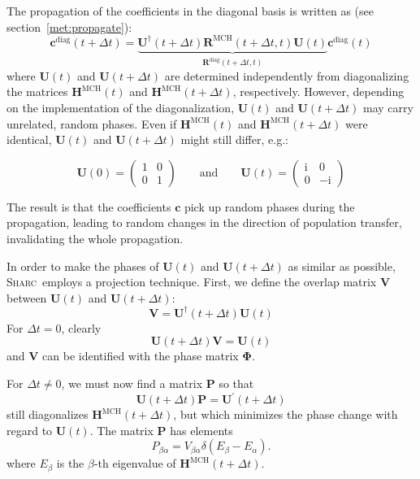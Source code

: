 \documentclass[a4paper,11pt,DIV=15,openany,twoside=false]{scrbook}
\newcommand{\tthdump}[1]{#1}
\newcommand{\sharc}{\textsc{Sharc}}
\newcommand{\I}{\ensuremath{\mathrm{i}}}
\renewcommand{\vec}[1]{\ensuremath{\mathbf{#1}}}
\begin{document}
The propagation of the coefficients in the diagonal basis is written as (see section~\ref{met:propagate}):
\begin{equation}
  \vec{c}^{\text{diag}}(t+\Delta t)=\underbrace{\vec{U}^\dagger(t+\Delta t)\vec{R}^{\text{MCH}}(t+\Delta t,t)\vec{U}(t)}_{\vec{R}^{\text{diag}}(t+\Delta t,t)}\vec{c}^{\text{diag}}(t)
\end{equation}
where $\vec{U}(t)$ and $\vec{U}(t+\Delta t)$ are determined independently from diagonalizing the matrices $\vec{H}^{\text{MCH}}(t)$ and $\vec{H}^{\text{MCH}}(t+\Delta t)$, respectively. However, depending on the implementation of the diagonalization, $\vec{U}(t)$ and $\vec{U}(t+\Delta t)$ may carry unrelated, random phases. Even if $\vec{H}^{\text{MCH}}(t)$ and $\vec{H}^{\text{MCH}}(t+\Delta t)$ were identical, $\vec{U}(t)$ and $\vec{U}(t+\Delta t)$ might still differ, e.g.:
\tthdump{
  \begin{equation}
    \vec{U}(0)=
    \begin{pmatrix}1&0\\0&1\end{pmatrix}
    \qquad\text{and}\qquad 
    \vec{U}(t)=
    \begin{pmatrix}\I&0\\0&-\I\end{pmatrix}
  \end{equation}
}
The result is that the coefficients $\vec{c}$ pick up random phases during the propagation, leading to random changes in the direction of population transfer, invalidating the whole propagation.

In order to make the phases of $\vec{U}(t)$ and $\vec{U}(t+\Delta t)$ as similar as possible, \sharc\ employs a projection technique. First, we define the overlap matrix $\vec{V}$ between $\vec{U}(t)$ and $\vec{U}(t+\Delta t)$:
\begin{equation}
  \vec{V}=\vec{U}^\dagger(t+\Delta t)\vec{U}(t)
\end{equation}
For $\Delta t=0$, clearly
\begin{equation}
  \vec{U}(t+\Delta t)\vec{V}=\vec{U}(t)
\end{equation}
and $\vec{V}$ can be identified with the phase matrix $\boldsymbol{\Phi}$.

For $\Delta t\neq 0$, we must now find a matrix $\vec{P}$ so that
\begin{equation}
  \vec{U}(t+\Delta t)\vec{P}=\vec{U}^\prime(t+\Delta t)
\end{equation}
still diagonalizes $\vec{H}^{\text{MCH}}(t+\Delta t)$, but which minimizes the phase change with regard to $\vec{U}(t)$.
The matrix $\vec{P}$ has elements
\begin{equation}
  P_{\beta\alpha}=V_{\beta\alpha}
  \delta\left(
    E_\beta-E_\alpha
  \right).
\end{equation}
where $E_\beta$ is the $\beta$-th eigenvalue of $\vec{H}^{\text{MCH}}(t+\Delta t)$.
\end{document}
